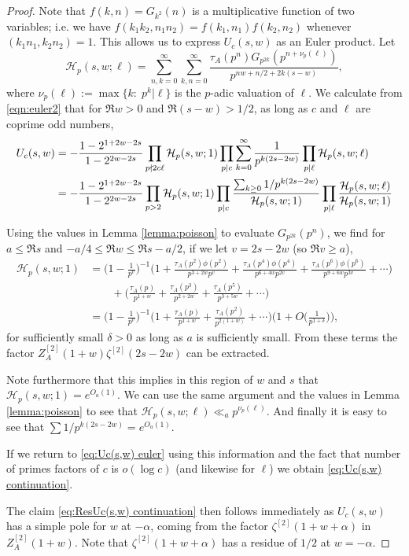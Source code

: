 \documentclass[12pt]{amsart}
\begin{document}
	\begin{proof}
		Note that $f(k,n)=G_{k^2}(n)$ is a multiplicative function of two variables; i.e. we have $f(k_1k_2,n_1n_2)=f(k_1,n_1)f(k_2,n_2)$ whenever $(k_1n_1,k_2n_2)=1$. 
		This allows us to express $U_c(s,w)$ as an Euler product. Let
		$$
		\mathcal{H}_p(s,w;\ell) = \sum_{n,k=0}^\infty \sum_{k,n=0}^\infty \frac{\tau_A(p^n)G_{p^{2k}}(p^{n+\nu_p(\ell)})}{p^{nw+n/2+2k (s-w)}},
		$$
		where $\nu_p(\ell) := \max \{k:\; p^k | \ell\}$ is the $p$-adic valuation of $\ell$. We calculate from \eqref{eqn:euler2} that for $\Re w > 0$ and $\Re(s-w) > 1/2$, as long as $c$ and $\ell$ are coprime odd numbers,
		\begin{align}
			\label{eq:Uc(s,w) euler}
			\notag U_c(s,w) &= -\frac{1-2^{1+2w-2s}}{1-2^{2w-2s}} \prod_{p \nmid 2c\ell} \mathcal{H}_p(s,w;1) \prod_{p | c} \sum_{k=0}^\infty \frac{1}{p^{k(2s-2w)}} \prod_{p | \ell} \mathcal{H}_p(s,w;\ell) \\
			&= -\frac{1-2^{1+2w-2s}}{1-2^{2w-2s}}  \prod_{p>2} \mathcal{H}_p(s,w;1) \prod_{\substack{p|c}} \frac{ \sum_{k\geq 0} 1/p^{k(2s-2w)}}{\mathcal{H}_p(s,w;1) } \prod_{p | \ell} \frac{\mathcal{H}_p(s,w;\ell)}{\mathcal{H}_p(s,w;1)}
		\end{align}
		
		Using the values in Lemma \ref{lemma:poisson} to evaluate $G_{p^{2k}}(p^n)$, we find for $a \leq \Re s $ and $-a/4 \leq \Re w \leq \Re s - a/2$, if we let $v = 2s-2w$ (so $\Re v \geq a$),
		\begin{align*}
			\mathcal{H}_p(s,w;1) &=\Big(1 - \frac{1}{p^v}\Big)^{-1} \Big(1 + \frac{\tau_A(p^2) \phi(p^2)}{p^{3+2w} p^v} + \frac{\tau_A(p^4) \phi(p^4)}{p^{6+4w} p^{2v}} + \frac{\tau_A(p^6) \phi(p^6)}{p^{9+6w} p^{3v}}+\cdots \Big) \\
			&\quad\quad + \Big( \frac{\tau_A(p)}{p^{1+w}} + \frac{\tau_A(p^3)}{p^{2+2w}} + \frac{\tau_A(p^5)}{p^{3+5w}} +\cdots \Big)\\
			&= \Big(1 - \frac{1}{p^v}\Big)^{-1} \Big(1 + \frac{\tau_A(p)}{p^{1+w}} + \frac{\tau_A(p^2)}{p^{2(1+w)}}+\cdots\Big)\Big(1 + O\Big(\frac{1}{p^{1+\delta}}\Big)\Big),
		\end{align*}
		for sufficiently small $\delta > 0$ as long as $a$ is sufficiently small. From these terms the factor $Z^{[2]}_A(1+w) \zeta^{[2]}(2s-2w)$ can be extracted. 
		
		Note furthermore that this implies in this region of $w$ and $s$ that $\mathcal{H}_p(s,w;1) = e^{O_a(1)}$. We can use the same argument and the values in Lemma \ref{lemma:poisson} to see that $\mathcal{H}_p(s,w;\ell) \ll_a p^{\nu_p(\ell)}$. And finally it is easy to see that $\sum 1/p^{k(2s-2w)} = e^{O_a(1)}$. 
		
		If we return to \eqref{eq:Uc(s,w) euler} using this information and the fact that number of primes factors of $c$ is $o(\log c)$ (and likewise for $\ell$) we obtain \eqref{eq:Uc(s,w) continuation}.
		
		The claim \eqref{eq:ResUc(s,w) continuation} then follows immediately as $U_c(s,w)$ has a simple pole for $w$ at $-\alpha$, coming from the factor $\zeta^{[2]}(1+w+\alpha)$ in $Z^{[2]}_A(1+w)$. Note that $\zeta^{[2]}(1+w+\alpha)$ has a residue of $1/2$ at $w = -\alpha$.
	\end{proof}
	
\end{document}
